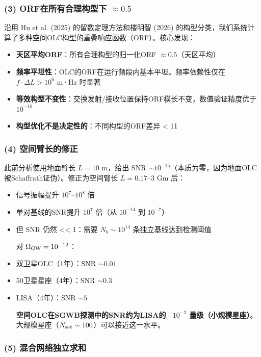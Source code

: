 \documentclass[12pt,a4paper]{article}
\begin{document}
\subsubsection{(3) ORF在所有合理构型下 $\approx 0.5$}


沿用 Hu et al. (2025) 的留数定理方法和楼明智 (2026) 的构型分类，我们系统计算了多种空间OLC构型的重叠响应函数（ORF）。核心发现：

\begin{itemize}
  \item \textbf{天区平均ORF}：所有合理构型的归一化ORF $\approx 0.5$（天区平均）
  \item \textbf{频率平坦性}：OLC的ORF在运行频段内基本平坦。频率依赖性仅在 $f \cdot \Delta L > 10^6$ m·Hz 时显著
  \item \textbf{等效构型不变性}：交换发射/接收位置保持ORF模长不变，数值验证精度优于 $10^{-10}$
  \item \textbf{构型优化不是决定性的}：不同构型的ORF差异 < 11%

\end{itemize}
\subsubsection{(4) 空间臂长的修正}


此前分析使用地面臂长 $L = 10$ m，给出 SNR $\sim 10^{-15}$（本质为零，因为地面OLC被Schaffrath证伪）。修正为空间臂长 $L = 0.17$–3 Gm 后：

\begin{itemize}
  \item 信号振幅提升 $10^7$–$10^8$ 倍
  \item 单对基线的SNR提升 $10^7$ 倍（从 $10^{-14}$ 到 $10^{-7}$）
  \item 但 SNR 仍然 << 1：需要 $N_b \sim 10^{14}$ 条独立基线达到检测阈值

对 $\Omega_{\rm GW} = 10^{-12}$：
  \item 双卫星OLC（1年）：SNR $\sim 0.01$
  \item 50卫星星座（4年）：SNR $\sim 0.3$
  \item LISA（4年）：SNR $\sim 5$

\textbf{空间OLC在SGWB探测中的SNR约为LISA的 ~$10^{-2}$ 量级（小规模星座）}。大规模星座（$N_{\rm sat} \sim 100$）可以接近这一水平。

\end{itemize}
\subsubsection{(5) 混合网络独立求和}
\end{document}
